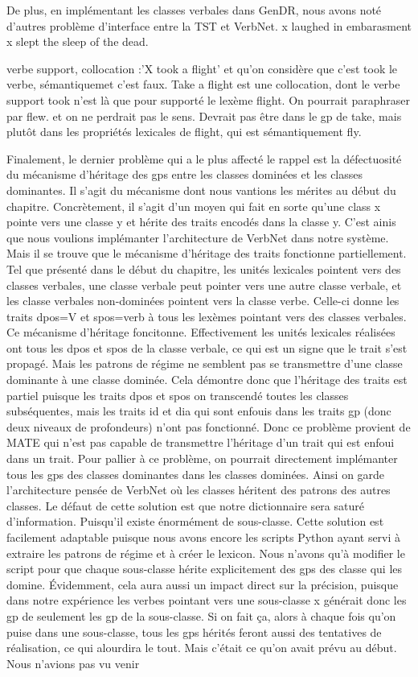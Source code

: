 De plus, en implémentant les classes verbales dans GenDR, nous avons noté d'autres problème d'interface entre la \ac{TST} et VerbNet. 
x laughed in embarasment 
x slept the sleep of the dead. 

verbe support, collocation :'X took a flight' et qu'on considère que c'est took le verbe, sémantiquemet c'est faux. Take a flight est une collocation, dont le verbe support took n'est là que pour supporté le lexème flight. On pourrait paraphraser par flew. et on ne perdrait pas le sens. Devrait pas être dans le gp de take, mais plutôt dans les propriétés lexicales de flight, qui est sémantiquement fly. 

Finalement, le dernier problème qui a le plus affecté le rappel est la défectuosité du mécanisme d'héritage des gps entre les classes dominées et les classes dominantes. Il s'agit du mécanisme dont nous vantions les mérites au début du chapitre. Concrètement, il s'agit d'un moyen qui fait en sorte qu'une class x pointe vers une classe y et hérite des traits encodés dans la classe y. C'est ainis que nous voulions implémanter l'architecture de VerbNet dans notre système. Mais il se trouve que le mécanisme d'héritage des traits fonctionne partiellement. Tel que présenté dans le début du chapitre, les unités lexicales pointent vers des classes verbales, une classe verbale peut pointer vers une autre classe verbale, et les classe verbales non-dominées pointent vers la classe verbe. Celle-ci donne les traits dpos=V et spos=verb à tous les lexèmes pointant vers des classes verbales. Ce mécanisme d'héritage foncitonne. Effectivement les unités lexicales réalisées ont tous les dpos et spos de la classe verbale, ce qui est un signe que le trait s'est propagé. Mais les patrons de régime ne semblent pas se transmettre d'une classe dominante à une classe dominée. Cela démontre donc que l'héritage des traits est partiel puisque les traits dpos et spos on transcendé toutes les classes subséquentes, mais les traits id et dia qui sont enfouis dans les traits gp (donc deux niveaux de profondeurs) n'ont pas fonctionné. Donc ce problème provient de MATE qui n'est pas capable de transmettre l'héritage d'un trait qui est enfoui dans un trait. Pour pallier à ce problème, on pourrait directement implémanter tous les gps des classes dominantes dans les classes dominées. Ainsi on garde l'architecture pensée de VerbNet où les classes héritent des patrons des autres classes. Le défaut de cette solution est que notre dictionnaire sera saturé d'information. Puisqu'il existe énormément de sous-classe. Cette solution est facilement adaptable puisque nous avons encore les scripts Python ayant servi à extraire les patrons de régime et à créer le lexicon. Nous n'avons qu'à modifier le script pour que chaque sous-classe hérite explicitement des gps des classe qui les domine. Évidemment, cela aura aussi un impact direct sur la précision, puisque dans notre expérience les verbes pointant vers une sous-classe x générait donc les gp de seulement les gp de la sous-classe. Si on fait ça, alors à chaque fois qu'on puise dans une sous-classe, tous les gps hérités feront aussi des tentatives de réalisation, ce qui alourdira le tout. Mais c'était ce qu'on avait prévu au début. Nous n'avions pas vu venir 